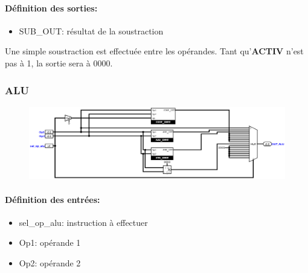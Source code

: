 \documentclass[a4paper]{article} %
\begin{document}
\paragraph{Définition des sorties:}
\begin{itemize}
    \item     SUB\_OUT: résultat de la soustraction
\end{itemize}
\medskip
Une simple soustraction est effectuée entre les opérandes. Tant qu'\textbf{ACTIV} n'est pas à 1, la sortie sera à 0000.

\subsubsection{ALU} \label{alu}
\begin{figure}[H]
    \centering
    \includegraphics[width=1\textwidth]{src/ALU.png}
    \label{fig:alu_pic}
\end{figure}
\paragraph{Définition des entrées:}
\begin{itemize}
    \item     sel\_op\_alu: instruction à effectuer
    \item     Op1: opérande 1
    \item     Op2: opérande 2
\end{itemize}
\end{document}
